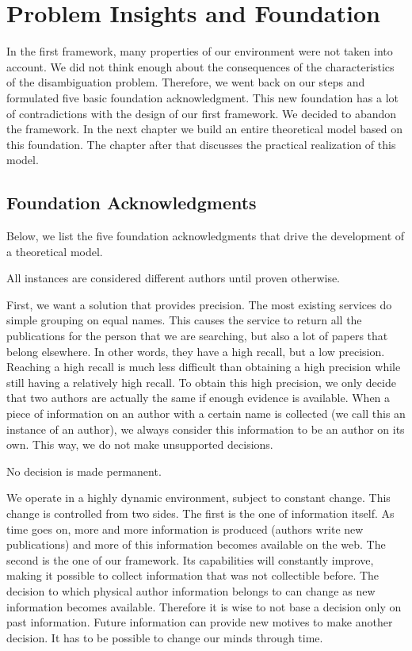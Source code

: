 \chapter{Problem Insights and Foundation}

In the first framework, many properties of our environment were not taken into account. We did not think enough about the consequences of the characteristics of the disambiguation problem. Therefore, we went back on our steps and formulated five basic foundation acknowledgment. This new foundation has a lot of contradictions with the design of our first framework. We decided to abandon the framework. In the next chapter we build an entire theoretical model based on this foundation. The chapter after that discusses the practical realization of this model.

\section{Foundation Acknowledgments}
\label{foundation}

Below, we list the five foundation acknowledgments that drive the development of a theoretical model.

\begin{foundation}
\label{foundation:different}
All instances are considered different authors until proven otherwise.
\end{foundation}

First, we want a solution that provides precision. The most existing services do simple grouping on equal names. This causes the service to return all the publications for the person that we are searching, but also a lot of papers that belong elsewhere. In other words, they have a high recall, but a low precision. Reaching a high recall is much less difficult than obtaining a high precision while still having a relatively high recall. To obtain this high precision, we only decide that two authors are actually the same if enough evidence is available. When a piece of information on an author with a certain name is collected (we call this an instance of an author), we always consider this information to be an author on its own. This way, we do not make unsupported decisions.

\begin{foundation}
\label{foundation:decision}
No decision is made permanent.
\end{foundation}

We operate in a highly dynamic environment, subject to constant change. This change is controlled from two sides. The first is the one of information itself. As time goes on, more and more information is produced (authors write new publications) and more of this information becomes available on the web. The second is the one of our framework. Its capabilities will constantly improve, making it possible to collect information that was not collectible before. The decision to which physical author information belongs to can change as new information becomes available. Therefore it is wise to not base a decision only on past information. Future information can provide new motives to make another decision. It has to be possible to change our minds through time.


